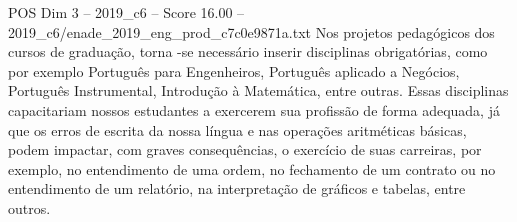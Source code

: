 \begin{textsample}{POS Dim 3 – 2019\_c6 – Score 16.00 – 2019\_c6/enade\_2019\_eng\_prod\_c7c0e9871a.txt}
Nos projetos pedagógicos dos cursos de graduação, torna -se necessário inserir disciplinas obrigatórias, como por exemplo Português para Engenheiros, Português aplicado a Negócios, Português Instrumental, Introdução à Matemática, entre outras.
Essas disciplinas capacitariam nossos estudantes a exercerem sua profissão de forma adequada, já que os erros de escrita da nossa língua e nas operações aritméticas básicas, podem impactar, com graves consequências, o exercício de suas carreiras, por exemplo, no entendimento de uma ordem, no fechamento de um contrato ou no entendimento de um relatório, na interpretação de gráficos e tabelas, entre outros.

\end{textsample}
